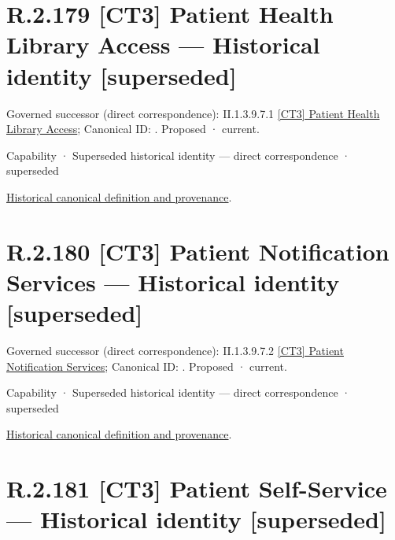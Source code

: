 \section*{R.2.179 [CT3] Patient Health Library Access — Historical identity [superseded]}
\label{navigation:R.2.179}

{\small Governed successor (direct correspondence): II.1.3.9.7.1 \hyperref[element:808e5a3c3f6b496fa329962088f0bee0]{[CT3] Patient Health Library Access}; Canonical ID: \texttt{}. Proposed · current.}\par
\label{element:b132224cfa6f435f8f2a66a3878d6df6}
{\small Capability · Superseded historical identity — direct correspondence · superseded}\par
\href{../../../../../../../continuum/strategy/capability/b132224cfa6f435f8f2a66a3878d6df6.md}{Historical canonical definition and provenance}.\par
\section*{R.2.180 [CT3] Patient Notification Services — Historical identity [superseded]}
\label{navigation:R.2.180}

{\small Governed successor (direct correspondence): II.1.3.9.7.2 \hyperref[element:9d172cd511b742499c4e7c23f6630a35]{[CT3] Patient Notification Services}; Canonical ID: \texttt{}. Proposed · current.}\par
\label{element:35c5be472bf2433fbbde9646d87aefb3}
{\small Capability · Superseded historical identity — direct correspondence · superseded}\par
\href{../../../../../../../continuum/strategy/capability/35c5be472bf2433fbbde9646d87aefb3.md}{Historical canonical definition and provenance}.\par
\section*{R.2.181 [CT3] Patient Self-Service — Historical identity [superseded]}
\label{navigation:R.2.181}

